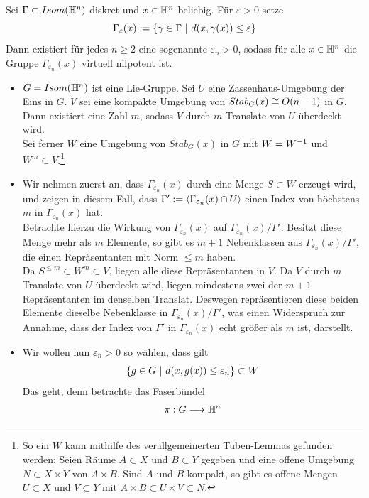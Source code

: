 \documentclass{book}
\renewcommand{\epsilon}{\varepsilon}
\begin{document}
Sei $\Gamma \subset Isom(\mathbb{H}^n)$ diskret und $x \in \mathbb{H}^n$ beliebig. Für $\epsilon > 0$ setze
\[ \Gamma_\epsilon(x) := \set{\gamma \in \Gamma}{d(x, \gamma(x)) \leq \epsilon} \]
Dann existiert für jedes $n\geq 2$ eine sogenannte  $\epsilon_n > 0$, sodass für alle $x \in \mathbb{H}^n$ die Gruppe $\Gamma_{\epsilon_n}(x)$ virtuell nilpotent ist.
\begin{Beweis}{}
	\begin{itemize}
		\item $G = Isom(\mathbb{H}^n)$ ist eine Lie-Gruppe.
		Sei $U$ eine Zassenhaus-Umgebung der Eins in $G$. $V$ sei eine kompakte Umgebung von $Stab_G(x) \overset{}{\cong} O(n-1)$ in $G$. Dann existiert eine Zahl $m$, sodass $V$ durch $m$ Translate von $U$ überdeckt wird.\\
		Sei ferner $W$ eine Umgebung von $Stab_G(x)$ in $G$ mit $W = W^{-1}$ und $W^m \subset V$.\footnote{
			So ein $W$ kann mithilfe des verallgemeinerten Tuben-Lemmas gefunden werden: Seien Räume $A\subset X$ und $B \subset Y$ gegeben und eine offene Umgebung $N \subset X \times Y$ von $A\times B$. Sind $A$ und $B$ kompakt, so gibt es offene Mengen $U \subset X$ und $V \subset Y$ mit $A\times B \subset U \times V\subset N$.
		}
	\item Wir nehmen zuerst an, dass $\Gamma_{\epsilon_n}(x)$ durch eine Menge $S \subset W$ erzeugt wird, und zeigen in diesem Fall, dass $\Gamma' := \shrp{\Gamma_{\epsilon_n}(x) \cap U}$ einen Index von höchstens $m$ in $\Gamma_{\epsilon_n}(x)$ hat.\\
	Betrachte hierzu die Wirkung von $\Gamma_{\epsilon_n}(x)$ auf $\Gamma_{\epsilon_n}(x) / \Gamma'$. Besitzt diese Menge mehr als $m$ Elemente, so gibt es $m+1$ Nebenklassen aus $\Gamma_{\epsilon_n}(x) / \Gamma'$, die einen Repräsentanten mit Norm $\leq m$ haben.\\
	Da $S^{\leq m} \subset W^m \subset V$, liegen alle diese Repräsentanten in $V$. Da $V$ durch $m$ Translate von $U$ überdeckt wird, liegen mindestens zwei der $m+1$ Repräsentanten im denselben Translat. Deswegen repräsentieren diese beiden Elemente dieselbe Nebenklasse in $\Gamma_{\epsilon_n}(x) / \Gamma'$, was einen Widerspruch zur Annahme, dass der Index von $\Gamma'$ in $\Gamma_{\epsilon_n}(x)$ echt größer als $m$ ist, darstellt.
	\item Wir wollen nun $\epsilon_n > 0$ so wählen, dass gilt
	\[ \set{g \in G}{d(x, g(x)) \leq \epsilon_n} \subset W \]
Das geht, denn betrachte das Faserbündel
	\begin{align*}
	\pi : G & \Pfeil{} \H^n\\

\end{align*}
\end{itemize}
\end{Beweis}
\end{document}
